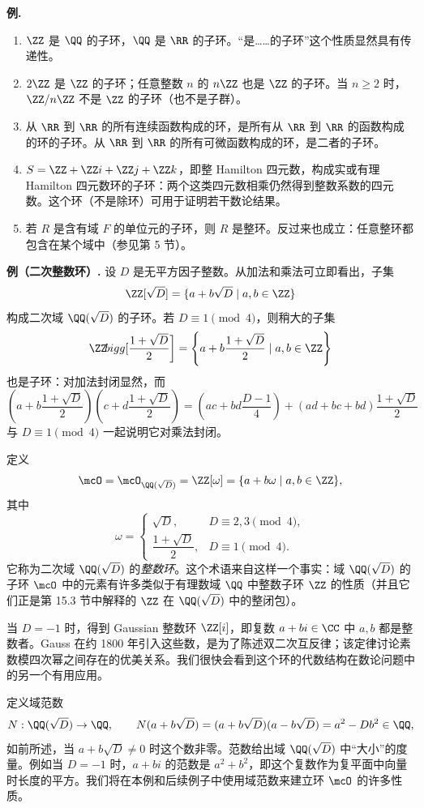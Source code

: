 \medskip
\noindent\textbf{例.}
\begin{enumerate}[label=(\arabic*)]
  \item $\ZZ$ 是 $\QQ$ 的子环，$\QQ$ 是 $\RR$ 的子环。“是……的子环”这个性质显然具有传递性。
  \item $2\ZZ$ 是 $\ZZ$ 的子环；任意整数 $n$ 的 $n\ZZ$ 也是 $\ZZ$ 的子环。当 $n\geq2$ 时，$\ZZ/n\ZZ$ 不是 $\ZZ$ 的子环（也不是子群）。
  \item 从 $\RR$ 到 $\RR$ 的所有连续函数构成的环，是所有从 $\RR$ 到 $\RR$ 的函数构成的环的子环。从 $\RR$ 到 $\RR$ 的所有可微函数构成的环，是二者的子环。
  \item $S=\ZZ+\ZZ i+\ZZ j+\ZZ k$，即整 Hamilton 四元数，构成实或有理 Hamilton 四元数环的子环：两个这类四元数相乘仍然得到整数系数的四元数。这个环（不是除环）可用于证明若干数论结果。
  \item 若 $R$ 是含有域 $F$ 的单位元的子环，则 $R$ 是整环。反过来也成立：任意整环都包含在某个域中（参见第 5 节）。
\end{enumerate}

\medskip
\noindent\textbf{例（二次整数环）.}
设 $D$ 是无平方因子整数。从加法和乘法可立即看出，子集
\[
  \ZZ[\sqrt D]=\{a+b\sqrt D\mid a,b\in\ZZ\}
\]
构成二次域 $\QQ(\sqrt D)$ 的子环。若 $D\equiv1\pmod4$，则稍大的子集
\[
  \ZZ\!bigg[\frac{1+\sqrt D}{2}\bigg]
  =\left\{a+b\frac{1+\sqrt D}{2}\mid a,b\in\ZZ\right\}
\]
也是子环：对加法封闭显然，而
\[
\left(a+b\frac{1+\sqrt D}{2}\right)
\left(c+d\frac{1+\sqrt D}{2}\right)
=(ac+bd\frac{D-1}{4})+(ad+bc+bd)\frac{1+\sqrt D}{2}
\]
与 $D\equiv1\pmod4$ 一起说明它对乘法封闭。

定义
\[
  \mcO=\mcO_{\QQ(\sqrt D)}=\ZZ[\omega]=\{a+b\omega\mid a,b\in\ZZ\},
\]
其中
\[
  \omega=\begin{cases}
  \sqrt D,&D\equiv2,3\pmod4,\\[2mm]
  \dfrac{1+\sqrt D}{2},&D\equiv1\pmod4.
  \end{cases}
\]
它称为二次域 $\QQ(\sqrt D)$ 的\emph{整数环}。这个术语来自这样一个事实：域 $\QQ(\sqrt D)$ 的子环 $\mcO$ 中的元素有许多类似于有理数域 $\QQ$ 中整数子环 $\ZZ$ 的性质（并且它们正是第 15.3 节中解释的 $\ZZ$ 在 $\QQ(\sqrt D)$ 中的整闭包）。

当 $D=-1$ 时，得到 Gaussian 整数环 $\ZZ[i]$，即复数 $a+bi\in\CC$ 中 $a,b$ 都是整数者。Gauss 在约 1800 年引入这些数，是为了陈述双二次互反律；该定律讨论素数模四次幂之间存在的优美关系。我们很快会看到这个环的代数结构在数论问题中的另一个有用应用。

定义域范数
\[
  N:\QQ(\sqrt D)\to\QQ,
  \qquad N(a+b\sqrt D)=(a+b\sqrt D)(a-b\sqrt D)=a^2-Db^2\in\QQ,
\]
如前所述，当 $a+b\sqrt D\neq0$ 时这个数非零。范数给出域 $\QQ(\sqrt D)$ 中“大小”的度量。例如当 $D=-1$ 时，$a+bi$ 的范数是 $a^2+b^2$，即这个复数作为复平面中向量时长度的平方。我们将在本例和后续例子中使用域范数来建立环 $\mcO$ 的许多性质。

